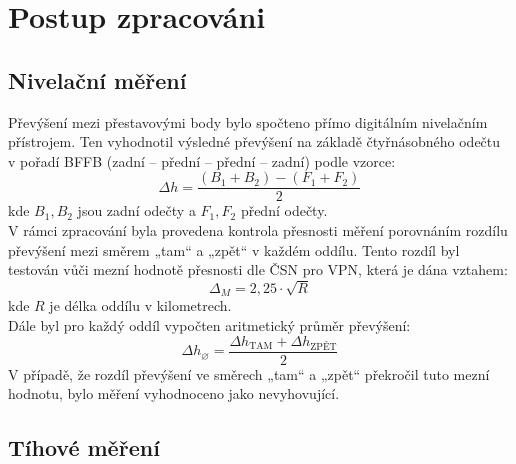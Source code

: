 \section{Postup zpracováni}

\subsection{Nivelační měření}

Převýšení mezi přestavovými body bylo spočteno přímo digitálním nivelačním přístrojem. Ten vyhodnotil výsledné převýšení na základě čtyřnásobného odečtu v pořadí BFFB (zadní – přední – přední – zadní) podle vzorce:
\[
\Delta h = \frac{(B_1 + B_2) - (F_1 + F_2)}{2}
\]
kde \( B_1, B_2 \) jsou zadní odečty a \( F_1, F_2 \) přední odečty.\\
V rámci zpracování byla provedena kontrola přesnosti měření porovnáním rozdílu převýšení mezi směrem „tam“ a „zpět“ v každém oddílu. Tento rozdíl byl testován vůči mezní hodnotě přesnosti dle ČSN pro VPN, která je dána vztahem:
\[
\Delta_M = 2,25 \cdot \sqrt{R}
\]
kde \( R \) je délka oddílu v kilometrech.\\
Dále byl pro každý oddíl vypočten aritmetický průměr převýšení:
\[
\Delta h_{\diameter} = \frac{\Delta h_{\text{TAM}} + \Delta h_{\text{ZPĚT}}}{2}
\]
V případě, že rozdíl převýšení ve směrech „tam“ a „zpět“ překročil tuto mezní hodnotu, bylo měření vyhodnoceno jako nevyhovující.\cite{zadani}

\subsection{Tíhové měření}
